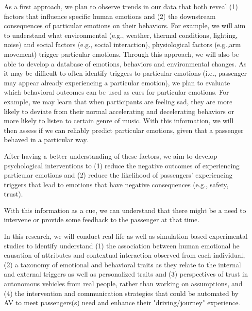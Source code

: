 As a first approach, we plan to observe trends in our data that both reveal (1) factors that influence specific human emotions and (2) the downstream consequences of particular emotions on their behaviors. For example, we will aim to understand what environmental (e.g., weather, thermal conditions, lighting, noise) and social factors (e.g., social interaction), physiological factors (e.g.,arm movement) trigger particular emotions. Through this approach, we will also be able to develop a database of  emotions, behaviors and environmental changes. %
As it may be difficult to often identify triggers to particular emotions (i.e., passenger may appear already experiencing a particular emotion), we plan to evaluate which behavioral outcomes can be used as cues for particular emotions. For example, we may learn that when participants are feeling sad, they are more likely to deviate from their normal accelerating and decelerating behaviors or more likely to listen to certain genre of music. With this information, we will then assess if we can reliably predict particular emotions, given that a passenger behaved in a particular way. 

After having a better understanding of these factors, we aim to develop psychological interventions to (1) reduce the negative outcomes of experiencing particular emotions  and (2) reduce the likelihood of passengers’ experiencing triggers that lead to emotions that have negative consequences (e.g., safety, trust). 


With this information as a cue, we can understand that there might be a need to intervene or provide some feedback to the passenger at that time. 


In this research, we will conduct real-life as well as simulation-based experimental studies to identify understand (1) the association between human emotional he causation of attributes and contextual interaction observed from each individual, (2) a taxonomy of emotional and behavioral traits as they relate to the internal and external triggers as well as personalized traits and (3) perspectives of trust in autonomous vehicles from real people, rather than working on assumptions, and (4) the intervention and communication strategies that could be automated by AV to meet passengers(s) need and enhance their "driving/journey" experience.



